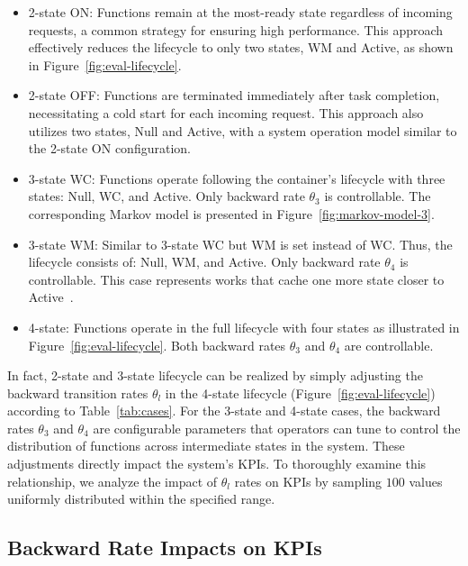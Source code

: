 \begin{itemize}
\item 2-state ON: Functions remain at the most-ready state regardless of incoming requests, a common strategy for ensuring high performance. This approach effectively reduces the lifecycle to only two states, WM and Active, as shown in Figure~\ref{fig:eval-lifecycle}. 

\item 2-state OFF: Functions are terminated immediately after task completion, necessitating a cold start for each incoming request. This approach also utilizes two states, Null and Active, with a system operation model similar to the 2-state ON configuration. 

\item 3-state WC: Functions operate following the container's lifecycle with three states: Null, WC, and Active. Only backward rate $\theta_3$ is controllable. The corresponding Markov model is presented in Figure~\ref{fig:markov-model-3}. 

\item 3-state WM: Similar to 3-state WC but WM is set instead of WC. Thus, the lifecycle consists of: Null, WM, and Active. Only backward rate $\theta_4$ is controllable. This case represents works that cache one more state closer to Active~\cite{sui2024pre, pratap2025fine}.  

\item 4-state: Functions operate in the full lifecycle with four states as illustrated in Figure~\ref{fig:eval-lifecycle}. Both backward rates $\theta_3$ and $\theta_4$ are controllable. 

\end{itemize}

In fact, 2-state and 3-state lifecycle can be realized by simply adjusting the backward transition rates $\theta_l$ in the 4-state lifecycle (Figure~\ref{fig:eval-lifecycle}) according to Table~\ref{tab:cases}. For the 3-state and 4-state cases, the backward rates $\theta_3$ and $\theta_4$ are configurable parameters that operators can tune to control the distribution of functions across intermediate states in the system. These adjustments directly impact the system's KPIs. To thoroughly examine this relationship, we analyze the impact of $\theta_l$ rates on KPIs by sampling $100$ values uniformly distributed within the specified range.

\subsection{Backward Rate Impacts on KPIs}


